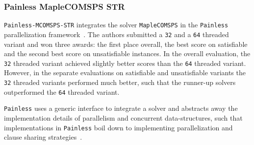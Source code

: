\documentclass{elsarticle}
\makeatletter
\newcommand{\solver}[1]{\texttt{#1}}
\newcommand{\stack}[1]{%
\begin{tabular}{@{}l@{}}#1\checknextarg}
\newcommand{\checknextarg}{\@ifnextchar\bgroup{\gobblenextarg}{\end{tabular}}}
\newcommand{\gobblenextarg}[1]{\\#1\@ifnextchar\bgroup{\gobblenextarg}{\end{tabular}}}
\makeatother
\begin{document}


\subsubsection{Painless MapleCOMSPS STR} 

\solver{Painless-MCOMSPS-STR} integrates the solver \solver{MapleCOMSPS} in the \solver{Painless} parallelization framework~\cite{Frioux:2017:Painless,Liang:2017:Maplecomsps}. 
The authors submitted a \solver{32} and a \solver{64} threaded variant and won three awards: the first place overall, the best score on satisfiable and the second best score on unsatisfiable instances. 
In the overall evaluation, the \solver{32} threaded variant achieved slightly better scores than the \solver{64} threaded variant. 
However, in the separate evaluations on satisfiable and unsatisfiable variants the \solver{32} threaded variants performed much better, such that the runner-up solvers outperformed the \solver{64} threaded variant. 

\solver{Painless} uses a generic interface to integrate a solver and abstracts away the implementation details of parallelism and concurrent data-structures, such that implementations in \solver{Painless} boil down to implementing parallelization and clause sharing strategies~\cite{Frioux:2017:Painless}. 
\end{document}
